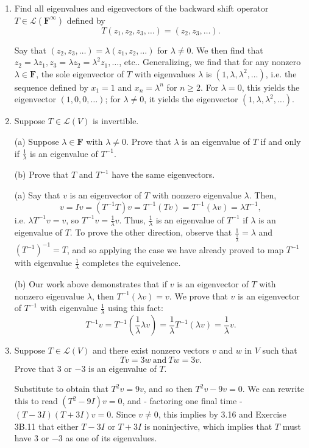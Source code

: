 \documentclass{book}
\begin{document}
\begin{enumerate}
\item Find all eigenvalues and eigenvectors of the backward shift operator \(T \in \mathcal{L}(\textbf{F}^{\infty})\) defined by \[T(z_1,z_2,z_3,\dots)=(z_2,z_3,\dots).\]

Say that \((z_2,z_3,\dots)=\lambda(z_1,z_2,\dots)\) for \(\lambda \neq 0\).  We then find that \(z_2=\lambda{z_1}, z_3=\lambda{z_2}=\lambda^2z_1,\dots\), etc..  Generalizing, we find that for any nonzero \(\lambda \in \textbf{F}\), the sole eigenvector of \(T\) with eigenvalues \(\lambda\) is \((1,\lambda,\lambda^2,\dots)\), i.e. the sequence defined by \(x_1=1\) and \(x_n=\lambda^n\) for \(n \geq 2\).  For \(\lambda=0\), this yields the eigenvector \((1,0,0,\dots)\); for \(\lambda \neq 0\), it yields the eigenvector \((1,\lambda,\lambda^2,\dots)\).

\item Suppose \(T \in \mathcal{L}(V)\) is invertible.

(a) Suppose \(\lambda \in \textbf{F}\) with \(\lambda \neq 0\).  Prove that \(\lambda\) is an eigenvalue of \(T\) if and only if \(\frac{1}{\lambda}\) is an eigenvalue of \(T^{-1}\).

(b) Prove that \(T\) and \(T^{-1}\) have the same eigenvectors.

(a) Say that \(v\) is an eigenvector of \(T\) with nonzero eigenvalue \(\lambda\).  Then, \[v=Iv=(T^{-1}T)v=T^{-1}(Tv)=T^{-1}(\lambda v)=\lambda T^{-1},\] i.e. \(\lambda T^{-1}v = v\), so \(T^{-1}v=\frac{1}{\lambda}v\).  Thus, \(\frac{1}{\lambda}\) is an eigenvalue of \(T^{-1}\) if \(\lambda\) is an eigenvalue of \(T\).  To prove the other direction, observe that \(\frac{1}{\frac{1}{\lambda}}=\lambda\) and \((T^{-1})^{-1}=T\), and so applying the case we have already proved to map \(T^{-1}\) with eigenvalue \(\frac{1}{\lambda}\) completes the equivelence.

(b) Our work above demonstrates that if \(v\) is an eigenvector of \(T\) with nonzero eigenvalue \(\lambda\), then \(T^{-1}(\lambda v)=v\).  We prove that \(v\) is an eigenvector of \(T^{-1}\) with eigenvalue \(\frac{1}{\lambda}\) using this fact: \[T^{-1}v=T^{-1}\left(\frac{1}{\lambda}\lambda v\right)=\frac{1}{\lambda}T^{-1}(\lambda v)=\frac{1}{\lambda}v.\]

\item Suppose \(T \in \mathcal{L}(V)\) and there exist nonzero vectors \(v\) and \(w\) in \(V\) such that \[Tv=3w \ \textrm{and} \ Tw=3v.\]  Prove that \(3\) or \(-3\) is an eigenvalue of \(T\).

Substitute to obtain that \(T^2v=9v\), and so then \(T^2v-9v=0\).  We can rewrite this to read \((T^2-9I)v=0\), and - factoring one final time - \((T-3I)(T+3I)v=0\).  Since \(v \neq 0\), this implies by 3.16 and Exercise 3B.11 that either \(T-3I\) or \(T+3I\) is noninjective, which implies that \(T\) must have \(3\) or \(-3\) as one of its eigenvalues.


\end{enumerate}
\end{document}
